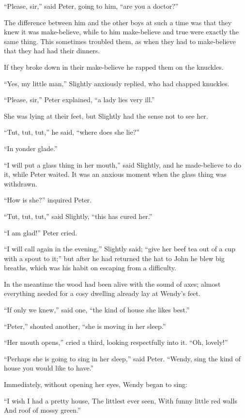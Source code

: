 ``Please, sir,'' said Peter, going to him, ``are you a doctor?''

The difference between him and the other boys at such a time was that
they knew it was make-believe, while to him make-believe and true were
exactly the same thing. This sometimes troubled them, as when they had
to make-believe that they had had their dinners.

If they broke down in their make-believe he rapped them on the
knuckles.

``Yes, my little man,'' Slightly anxiously replied, who had chapped
knuckles.

``Please, sir,'' Peter explained, ``a lady lies very ill.''

She was lying at their feet, but Slightly had the sense not to see her.

``Tut, tut, tut,'' he said, ``where does she lie?''

``In yonder glade.''

``I will put a glass thing in her mouth,'' said Slightly, and he
made-believe to do it, while Peter waited. It was an anxious moment
when the glass thing was withdrawn.

``How is she?'' inquired Peter.

``Tut, tut, tut,'' said Slightly, ``this has cured her.''

``I am glad!'' Peter cried.

``I will call again in the evening,'' Slightly said; ``give her beef tea
out of a cup with a spout to it;'' but after he had returned the hat to
John he blew big breaths, which was his habit on escaping from a
difficulty.

In the meantime the wood had been alive with the sound of axes; almost
everything needed for a cosy dwelling already lay at Wendy's feet.

``If only we knew,'' said one, ``the kind of house she likes best.''

``Peter,'' shouted another, ``she is moving in her sleep.''

``Her mouth opens,'' cried a third, looking respectfully into it. ``Oh,
lovely!''

``Perhaps she is going to sing in her sleep,'' said Peter. ``Wendy, sing
the kind of house you would like to have.''

Immediately, without opening her eyes, Wendy began to sing:

``I wish I had a pretty house,
    The littlest ever seen,
With funny little red walls
    And roof of mossy green.''

